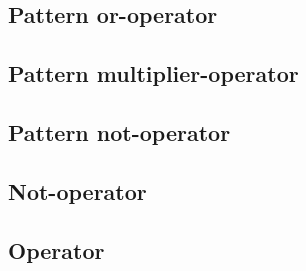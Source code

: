 \subsection{Pattern or-operator}



\subsection{Pattern multiplier-operator}



\subsection{Pattern not-operator}



\subsection{Not-operator}



\subsection{Operator}


